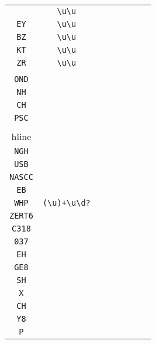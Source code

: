 \begin{longtable}{cccccccc}
\begin{tabular}{ll}
    \verb|OL| & \verb|\u\u|\\
\verb|EY| & \verb|\u\u|\\
\verb|BZ| & \verb|\u\u|\\
\verb|KT| & \verb|\u\u|\\
\verb|ZR| & \verb|\u\u|
\end{tabular}
\\\midrule 
\begin{tabular}{l}
    \verb|SB1|\\
\verb|OND|\\
\verb|NH|\\
\verb|CH|\\
\verb|PSC|\\
\\hline\\
\verb|NGH|\\
\verb|USB|\\
\verb|NASCC|\\
\verb|EB|\\
\verb|WHP|
\end{tabular}

&
\verb|(\u)+\u\d?|
&

\begin{tabular}{l}
    \verb|(\u)*(\d)*|\\
\verb|ZERT6|\\
\verb|C318|\\
\verb|037|\\
\verb|EH|\\
\verb|GE8|
\end{tabular}

&

\begin{tabular}{l}
    \verb.\u((\u)*(\d)*)|(H).\\
\verb|SH|\\
\verb|X|\\
\verb|CH|\\
\verb|Y8|\\
\verb|P|
\end{tabular}

&


\end{longtable}
